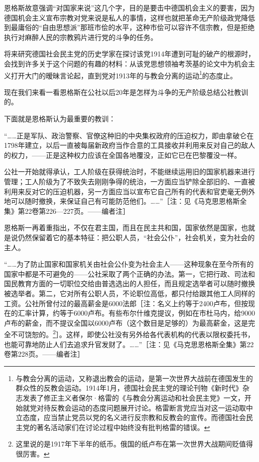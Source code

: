 \documentclass[UTF8, 12pt, a4paper]{ctexrep}
\begin{document}
恩格斯故意强调“对国家来说”这几个字，目的是要击中德国机会主义的要害，因为德国机会主义宣布宗教对党来说是私人的事情，这样也就把革命无产阶级政党降低到最庸俗的“自由思想派”那班市侩的水平，这种市侩可以容许不信宗教，但是拒绝执行对麻醉人民的宗教鸦片进行党的斗争的任务。

将来研究德国社会民主党的历史学家在探讨该党1914年遭到可耻的破产的根源时，会找到许多关于这个问题的有趣的材料：从该党思想领袖考茨基的论文中为机会主义打开大门的暧昧言论起，直到党对1913年的与教会分离的运动\footnote{与教会分离的运动，又称退出教会的运动，是第一次世界大战前在德国发生的群众性的反教会运动。1914年1月，德国社会民主党的理论刊物《新时代》杂志发表了修正主义者保尔·格雷的《与教会分离运动和社会民主党》一文，开始就党对待反教会运动的态度问题展开讨论。格雷断言党应当对这一运动取中立态度，应当禁止党员以党的名义进行反宗教和反教会的宣传。而德国社会民主党的著名活动家们在讨论过程中始终没有批判格雷的错误。}的态度止。

现在我们来看一看恩格斯在公社以后20年是怎样为斗争的无产阶级总结公社教训的。

下面就是恩格斯认为最重要的教训：

“……正是军队、政治警察、官僚这种旧的中央集权政府的压迫权力，即由拿破仑在1798年建立，以后一直被每届新政府当作合意的工具接收并利用来反对自己的敌人的权力，——正是这种权力应该在全国各地覆没，正如它已在巴黎覆没一样。

公社一开始就得承认，工人阶级在获得统治时，不能继续运用旧的国家机器来进行管理；工人阶级为了不致失去刚刚争得的统治，一方面应当铲除全部旧的、一直被利用来反对它的压迫机器，另一方面应当以宣布它自己所有的代表和官吏毫无例外地可以随时撤换，来保证自己有可能防范他们。……”［注：见《马克思恩格斯全集》第22卷第226—227页。——编者注］

恩格斯一再着重指出，不仅在君主国，而且在民主共和国，国家依然是国家，也就是说仍然保留着它的基本特征：把公职人员，“社会公仆”，社会机关，变为社会的主人。

“……为了防止国家和国家机关由社会公仆变为社会主人——这种现象在至今所有的国家中都是不可避免的——公社采取了两个正确的办法。第一，它把行政、司法和国民教育方面的一切职位交给由普选选出的人担任，而且规定选举者可以随时撤换被选举者。第二，它对所有公职人员，不论职位高低，都只付给跟其他工人同样的工资。公社所曾付过的最高薪金是6000法郎［注：名义上约等于2400卢布，但按现在的汇率计算，约等于6000卢布。有些布尔什维克提议，例如在市杜马内，给9000卢布的薪金，而不提议全国以6000卢布（这个数目是足够的）为最高薪金，这是完全不可饶恕的。\footnote{这里说的是1917年下半年的纸币。俄国的纸卢布在第一次世界大战期间贬值得很厉害。}］。这样，即使公社没有另外给各代表机构的代表以限权委托书，也能可靠地防止人们去追求升官发财了。……”［注：见《马克思恩格斯全集》第22卷第228页。——编者注］
\end{document}

